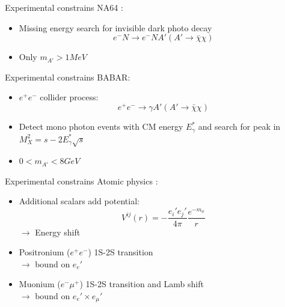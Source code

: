 \documentclass[11pt]{beamer}
\numberwithin{equation}{section}
\begin{document}
\begin{frame}{Experimental constrains}
NA64 \cite{Banerjee:2018vgk}:
\begin{itemize}
\item Missing energy search for invisible dark photo decay
\begin{equation*}
e^-N \rightarrow e^-N A' (A' \rightarrow \bar{\chi}\chi)
\end{equation*}
\item Only $m_{A'}>1MeV$
\end{itemize}
\begin{figure}[H]
\centering
{}
\end{figure}
\end{frame}

\begin{frame}{Experimental constrains}
BABAR:
\begin{itemize}
\item $e^+e^-$ collider process:
\begin{equation*}
e^+e^-\rightarrow \gamma A' (A' \rightarrow \bar{\chi}\chi)
\end{equation*}
\pause
\item Detect mono photon events with CM energy $E_\gamma^*$ and search for peak in $M_X^2=s-2E_\gamma^* \sqrt{s}$ 
\pause
\item $0 < m_{A'} < 8GeV$
\end{itemize}
\end{frame}

\begin{frame}{Experimental constrains}
Atomic physics \cite{Delaunay:2017dku} :
\begin{itemize}
\item Additional scalars add potential:
\begin{equation*}
V^{ij}(r)=-\frac{e_i'e_j'}{4\pi}\frac{e^{-m_\phi}}{r}
\end{equation*}
\pause
$\rightarrow$ Energy shift
\pause
\item Positronium ($e^+e^-$) 1S-2S transition\\
\pause
$\rightarrow$ bound on $e_e'$
\pause
\item Muonium ($e^-\mu^+$) 1S-2S transition and Lamb shift \\
\pause
$\rightarrow$ bound on $e_e'\times e_\mu'$
\end{itemize}

\end{frame}
\end{document}
